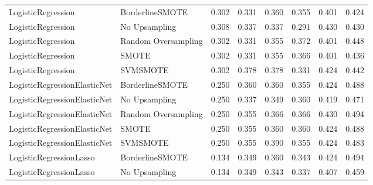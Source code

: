 \begin{tabular}{llllllll}
          LogisticRegression &     BorderlineSMOTE & 0.302 &                     0.331 &                 0.360 &                  0.355 &                                   0.401 &    0.424 \\
          LogisticRegression &       No Upsampling & 0.308 &                     0.337 &                 0.337 &                  0.291 &                                   0.430 &    0.430 \\
          LogisticRegression & Random Oversampling & 0.302 &                     0.331 &                 0.355 &                  0.372 &                                   0.401 &    0.448 \\
          LogisticRegression &               SMOTE & 0.302 &                     0.331 &                 0.355 &                  0.366 &                                   0.401 &    0.436 \\
          LogisticRegression &            SVMSMOTE & 0.302 &                     0.378 &                 0.378 &                  0.331 &                                   0.424 &    0.442 \\
LogisticRegressionElasticNet &     BorderlineSMOTE & 0.250 &                     0.360 &                 0.360 &                  0.355 &                                   0.424 &    0.488 \\
LogisticRegressionElasticNet &       No Upsampling & 0.250 &                     0.337 &                 0.349 &                  0.360 &                                   0.419 &    0.471 \\
LogisticRegressionElasticNet & Random Oversampling & 0.250 &                     0.355 &                 0.366 &                  0.366 &                                   0.430 &    0.494 \\
LogisticRegressionElasticNet &               SMOTE & 0.250 &                     0.355 &                 0.360 &                  0.360 &                                   0.424 &    0.488 \\
LogisticRegressionElasticNet &            SVMSMOTE & 0.250 &                     0.355 &                 0.390 &                  0.355 &                                   0.424 &    0.483 \\
     LogisticRegressionLasso &     BorderlineSMOTE & 0.134 &                     0.349 &                 0.360 &                  0.343 &                                   0.424 &    0.494 \\
     LogisticRegressionLasso &       No Upsampling & 0.134 &                     0.349 &                 0.343 &                  0.337 &                                   0.407 &    0.459 \\

\end{tabular}
